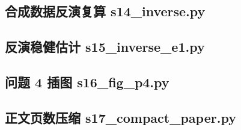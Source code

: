 \subsection{合成数据反演复算 s14\_inverse.py}


\subsection{反演稳健估计 s15\_inverse\_e1.py}


\subsection{问题 4 插图 s16\_fig\_p4.py}


\subsection{正文页数压缩 s17\_compact\_paper.py}


